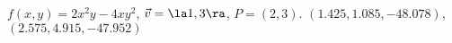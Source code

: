 {$f(x,y) = 2x^2y-4xy^2$,  $\vec v = \la 1,3\ra$, $P=(2,3)$.\label{12_06_ex_13}
}
{
$(1.425, 1.085, -48.078)$, $(2.575, 4.915, -47.952)$
}